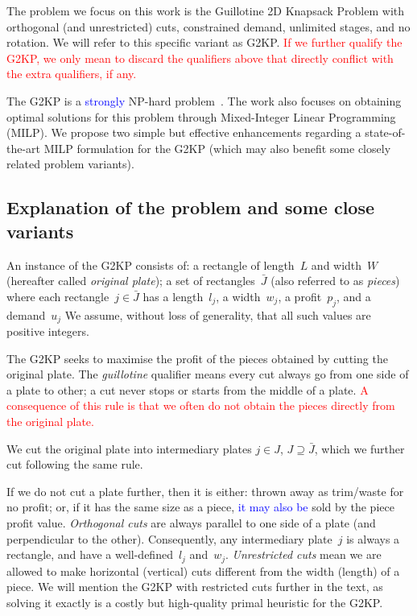 \documentclass[smallextended]{svjour3}       %
\newif\iffinalversion
\newcommand{\newtext}[1]{\iffinalversion%
#1%
\else%
\textcolor{blue}{#1}%
\fi%
}
\newcommand{\oldtext}[1]{\iffinalversion%
#1%
\else%
\textcolor{red}{#1}%
\fi%
}
\begin{document}
The problem we focus on this work is the Guillotine 2D Knapsack Problem with orthogonal (and unrestricted) cuts, constrained demand, unlimited stages, and no rotation.
We will refer to this specific variant as G2KP.
\oldtext{If we further qualify the G2KP, we only mean to discard the qualifiers above that directly conflict with the extra qualifiers, if any.}
The G2KP is a \newtext{strongly} NP-hard problem~\cite{russo:2020}.
The work also focuses on obtaining optimal solutions for this problem through Mixed-Integer Linear Programming (MILP).
We propose two simple but effective enhancements regarding a state-of-the-art MILP formulation for the G2KP (which may also benefit some closely related problem variants).

\subsection{Explanation of the problem and some close variants}

An instance of the G2KP consists of: a rectangle of length~\(L\) and width~\(W\) (hereafter called \emph{original plate}); a set of rectangles~\(\bar{J}\) (also referred to as \emph{pieces}) where each rectangle~\(j \in \bar{J}\) has a length~\(l_j\), a width~\(w_j\), a profit~\(p_j\), and a demand~\(u_j\)
We assume, without loss of generality, that all such values are positive integers.

The G2KP seeks to maximise the profit of the pieces obtained by cutting the original plate.
The \emph{guillotine} qualifier means every cut always go from one side of a plate to other; a cut never stops or starts from the middle of a plate.
\oldtext{A consequence of this rule is that we often do not obtain the pieces directly from the original plate.}
We cut the original plate into intermediary plates \(j \in J\), \(J \supseteq \bar{J}\), which we further cut following the same rule.

If we do not cut a plate further, then it is either: thrown away as trim/waste for no profit; or, if it has the same size as a piece, \newtext{it may also be} sold by the piece profit value.
\emph{Orthogonal cuts} are always parallel to one side of a plate (and perpendicular to the other).
Consequently, any intermediary plate~\(j\) is always a rectangle, and have a well-defined~\(l_j\) and~\(w_j\).
\emph{Unrestricted cuts} mean we are allowed to make horizontal (vertical) cuts different from the width (length) of a piece.
We will mention the G2KP with restricted cuts further in the text, as solving it exactly is a costly but high-quality primal heuristic for the G2KP.
\end{document}
